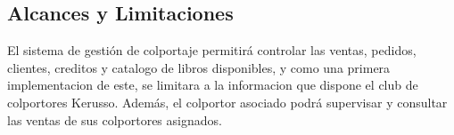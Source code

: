 \documentclass[runningheads]{llncs}
\begin{document}
\subsection{Alcances y Limitaciones}
El sistema de gestión de colportaje permitirá controlar las ventas, pedidos, clientes, creditos y catalogo de libros disponibles, y como una primera implementacion de este, se limitara a la informacion que dispone el club de colportores Kerusso. Además, el colportor asociado podrá supervisar y consultar las ventas de sus colportores asignados.

\newpage
\end{document}
